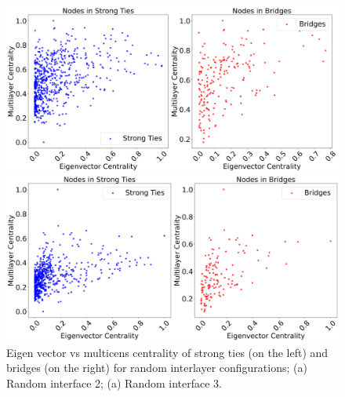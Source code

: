 \documentclass[10pt,letterpaper]{article}
\begin{document}
\begin{figure}[h!]
	\centering
	\begin{minipage}[b]{0.44\linewidth}
		\centering
		\includegraphics[width=\textwidth]{figs/fig11.png}
		\subcaption{}
	\end{minipage}
	\hspace{0.5cm}
	\begin{minipage}[b]{0.44\linewidth}
		\centering
		\includegraphics[width=\textwidth]{figs/fig12.png}
		\subcaption{}
	\end{minipage}
	\caption{Eigen vector vs multicens centrality of strong ties (on the left) and bridges (on the right) for random interlayer configurations; (a) Random interface 2; (a) Random interface 3. \label{fig:ties2}}
\end{figure}
\end{document}
